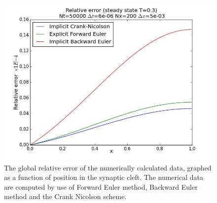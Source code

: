 \documentclass[12pt]{article}
\begin{document}
\begin{flushleft}
\begin{figure}[!h]
\begin{center}
\includegraphics[scale=0.4]{rel_error_all}
\caption{\label{fig:rel_error_all}The global relative error of the numerically calculated data, graphed as a function of position in the synaptic cleft. The numerical data are computed by use of Forward Euler method, Backward Euler method and the Crank Nicolson scheme.}
\end{center}
\end{figure}


\end{flushleft}
\end{document}
